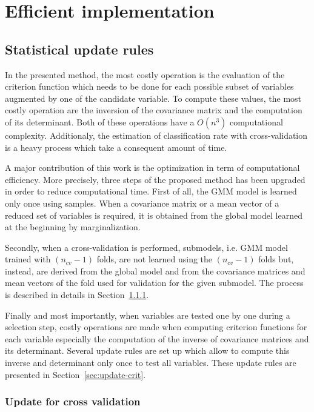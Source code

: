 \documentclass[journal,peerreview,onecolumn]{IEEEtran}
\begin{document}
\section{Efficient implementation}
\label{sec:implementation}

    \subsection{Statistical update rules}
    In the presented method, the most costly operation is the evaluation of the criterion function which needs to be done for each possible subset of variables augmented by one of the candidate variable. To compute these values, the most costly operation are the inversion of the covariance matrix and the computation of its determinant. Both of these operations have a $O(n^3)$ computational complexity. Additionaly, the estimation of classification rate with cross-validation is a heavy process which take a consequent amount of time.

    A major contribution of this work is the optimization in term of computational efficiency. More precisely, three steps of the proposed method has been upgraded in order to reduce computational time. First of all, the GMM model is learned only once using samples. When a covariance matrix or a mean vector of a reduced set of variables is required, it is obtained from the global model learned at the beginning by marginalization.

    Secondly, when a cross-validation is performed, submodels, i.e. GMM model trained with $(n_{cv}-1)$ folds, are not learned using the $(n_{cv}-1)$ folds but, instead, are derived from the global model and from the covariance matrices and mean vectors of the fold used for validation for the given submodel. The process is described in details in Section~\ref{sec:update-cv}.

    Finally and most importantly, when variables are tested one by one during a selection step, costly operations are made when computing criterion functions for each variable especially the computation of the inverse of covariance matrices and its determinant. Several update rules are set up which allow to compute this inverse and determinant only once to test all variables. These update rules are presented in Section~\ref{sec:update-crit}.

        \subsubsection{Update for cross validation}
        \label{sec:update-cv}
\end{document}
